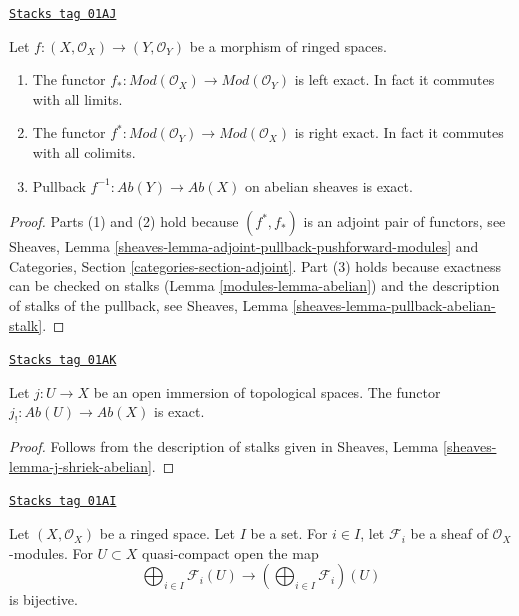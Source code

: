 \begin{lemma}
\label{modules-lemma-exactness-pushforward-pullback}
\href{https://stacks.math.columbia.edu/tag/01AJ}{\texttt{Stacks tag 01AJ}}

Let $f : (X, \mathcal{O}_X) \to (Y, \mathcal{O}_Y)$
be a morphism of ringed spaces.
\begin{enumerate}
\item The functor
$f_* : \textit{Mod}(\mathcal{O}_X) \to \textit{Mod}(\mathcal{O}_Y)$
is left exact. In fact it commutes with all limits.
\item The functor
$f^* : \textit{Mod}(\mathcal{O}_Y) \to \textit{Mod}(\mathcal{O}_X)$
is right exact. In fact it commutes with all colimits.
\item Pullback $f^{-1} : \textit{Ab}(Y) \to \textit{Ab}(X)$
on abelian sheaves is exact.
\end{enumerate}
\end{lemma}

\begin{proof}

Parts (1) and (2) hold because $(f^*, f_*)$ is an adjoint pair
of functors, see
Sheaves, Lemma \ref{sheaves-lemma-adjoint-pullback-pushforward-modules}
and
Categories, Section \ref{categories-section-adjoint}.
Part (3) holds because exactness can be checked on stalks
(Lemma \ref{modules-lemma-abelian})
and the description of stalks of the pullback, see
Sheaves, Lemma \ref{sheaves-lemma-pullback-abelian-stalk}.
\end{proof}

\begin{lemma}
\label{modules-lemma-j-shriek-exact}
\href{https://stacks.math.columbia.edu/tag/01AK}{\texttt{Stacks tag 01AK}}

Let $j : U \to X$ be an open immersion of topological spaces.
The functor $j_! : \textit{Ab}(U) \to \textit{Ab}(X)$
is exact.
\end{lemma}

\begin{proof}
Follows from the description of stalks
given in Sheaves, Lemma \ref{sheaves-lemma-j-shriek-abelian}.
\end{proof}

\begin{lemma}
\label{modules-lemma-section-direct-sum-quasi-compact}
\href{https://stacks.math.columbia.edu/tag/01AI}{\texttt{Stacks tag 01AI}}

Let $(X, \mathcal{O}_X)$ be a ringed space.
Let $I$ be a set. For $i \in I$, let $\mathcal{F}_i$
be a sheaf of $\mathcal{O}_X$-modules.
For $U \subset X$ quasi-compact open the map
$$
\bigoplus\nolimits_{i \in I} \mathcal{F}_i(U)
\longrightarrow
\left(\bigoplus\nolimits_{i \in I} \mathcal{F}_i\right)(U)
$$
is bijective.
\end{lemma}

